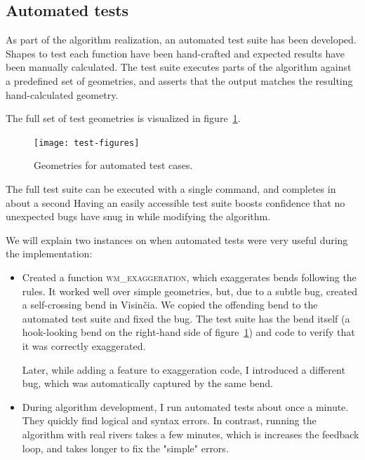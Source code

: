 \documentclass[a4paper]{article}
\begin{document}
\subsection{Automated tests}
\label{sec:automated-tests}

As part of the algorithm realization, an automated test suite has been
developed. Shapes to test each function have been hand-crafted and expected
results have been manually calculated. The test suite executes parts of the
algorithm against a predefined set of geometries, and asserts that the output
matches the resulting hand-calculated geometry.

The full set of test geometries is visualized in figure~\ref{fig:test-figures}.

\begin{figure}[ht]
    \centering
    \texttt{[image: test-figures]}
    \caption{Geometries for automated test cases.}
    \label{fig:test-figures}
\end{figure}

The full test suite can be executed with a single command, and completes in
about a second Having an easily accessible test suite boosts confidence that no
unexpected bugs have snug in while modifying the algorithm.

We will explain two instances on when automated tests were very useful during
the implementation:
\begin{itemize}

    \item Created a function \textsc{wm\_exaggeration}, which exaggerates bends
      following the rules. It worked well over simple geometries, but, due to a
      subtle bug, created a self-crossing bend in Visinčia. We copied the
      offending bend to the automated test suite and fixed the bug. The test
      suite has the bend itself (a hook-looking bend on the right-hand side of
      figure~\ref{fig:test-figures}) and code to verify that it was correctly
      exaggerated.

        Later, while adding a feature to exaggeration code, I introduced a
        different bug, which was automatically captured by the same bend.

    \item During algorithm development, I run automated tests about once a
        minute. They quickly find logical and syntax errors. In contrast,
        running the algorithm with real rivers takes a few minutes, which is
        increases the feedback loop, and takes longer to fix the "simple"
        errors.

\end{itemize}
\end{document}
